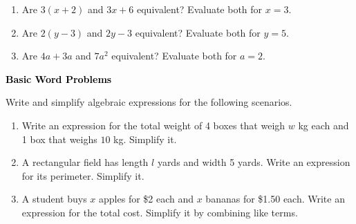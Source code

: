 \documentclass[12pt, letterpaper, fleqn]{article}
\begin{document}
\vspace{3mm}

\begin{enumerate}[itemsep=2.2cm, leftmargin=0.6cm]

\item Are $3(x + 2)$ and $3x + 6$ equivalent? Evaluate both for $x = 3$.

\vspace{2cm}

\item Are $2(y - 3)$ and $2y - 3$ equivalent? Evaluate both for $y = 5$.

\vspace{2cm}

\item Are $4a + 3a$ and $7a^2$ equivalent? Evaluate both for $a = 2$.

\vspace{2cm}

\end{enumerate}

\newpage

\begin{tcolorbox}[colback=black!10]
\large\textcolor{black}{\textbf{Basic Word Problems}}
\end{tcolorbox}

\noindent
Write and simplify algebraic expressions for the following scenarios.

\vspace{3mm}

\begin{enumerate}[itemsep=2.2cm, leftmargin=0.6cm]

\item Write an expression for the total weight of 4 boxes that weigh $w$ kg each and 1 box that weighs $10$ kg. Simplify it.

\vspace{2.2cm}

\item A rectangular field has length $l$ yards and width 5 yards. Write an expression for its perimeter. Simplify it.

\vspace{2.2cm}

\item A student buys $x$ apples for \$2 each and $x$ bananas for \$1.50 each. Write an expression for the total cost. Simplify it by combining like terms.

\vspace{2.2cm}

\end{enumerate}
\end{document}
